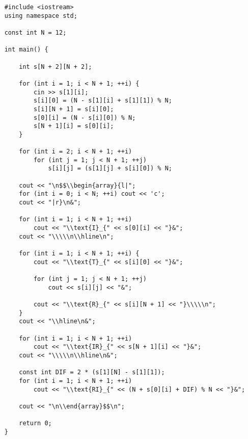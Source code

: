 		\newpage
	\begin{lstlisting}
	#include <iostream>
	using namespace std;
	
	const int N = 12;
	
	int main() {
	
		int s[N + 2][N + 2];
		
		for (int i = 1; i < N + 1; ++i) {
			cin >> s[1][i];
			s[i][0] = (N - s[1][i] + s[1][1]) % N;
			s[i][N + 1] = s[i][0];
			s[0][i] = (N - s[i][0]) % N;
			s[N + 1][i] = s[0][i];
		}
		
		for (int i = 2; i < N + 1; ++i)
			for (int j = 1; j < N + 1; ++j)
				s[i][j] = (s[1][j] + s[i][0]) % N;
		
		cout << "\n$$\\begin{array}{l|";
		for (int i = 0; i < N; ++i)	cout << 'c';
		cout << "|r}\n&";
		
		for (int i = 1; i < N + 1; ++i)
			cout << "\\text{I}_{" << s[0][i] << "}&";
		cout << "\\\\\n\\hline\n";
		
		for (int i = 1; i < N + 1; ++i) {
			cout << "\\text{T}_{" << s[i][0] << "}&";
		
			for (int j = 1; j < N + 1; ++j)
				cout << s[i][j] << "&";
			
			cout << "\\text{R}_{" << s[i][N + 1] << "}\\\\\n";
		}
		cout << "\\hline\n&";
		
		for (int i = 1; i < N + 1; ++i)
			cout << "\\text{IR}_{" << s[N + 1][i] << "}&";
		cout << "\\\\\n\\hline\n&";
		
		const int DIF = 2 * (s[1][N] - s[1][1]);
		for (int i = 1; i < N + 1; ++i)
			cout << "\\text{RI}_{" << (N + s[0][i] + DIF) % N << "}&";
		
		cout << "\n\\end{array}$$\n";
		
		return 0;
	}
	
	\end{lstlisting}